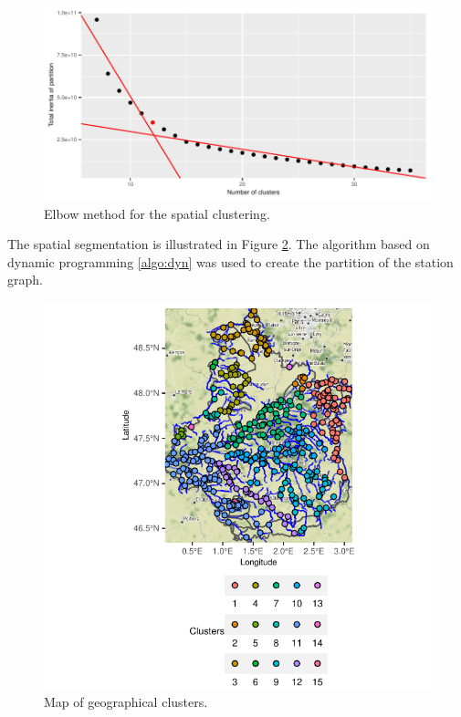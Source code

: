 \begin{figure}[htbp]
  \centering
  \includegraphics[]{figs/Chap5/Elb_clust.pdf}
  \caption{Elbow method for the spatial clustering.}
  \label{fig:elb:clust}
\end{figure}


The spatial segmentation is illustrated in Figure \ref{fig:clust}. The algorithm based on dynamic programming \ref{algo:dyn} was used to create the partition of the station graph.

\begin{figure}[htbp]
  \centering
  \includegraphics[]{figs/Chap5/Graph_clust.pdf}
  \caption{Map of geographical clusters.}
  \label{fig:clust}
\end{figure}

